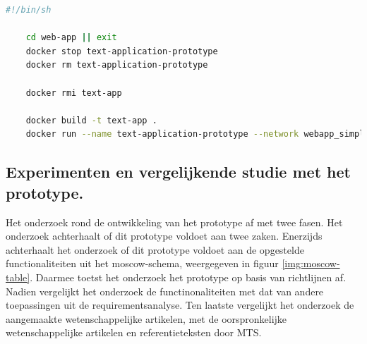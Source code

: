\begin{lstlisting}[language=Bash, caption={Script voor het opstarten van de Docker-container voor Unix-gebruikers}, label={code:bash-boot}]
	#!/bin/sh
	
	cd web-app || exit
	docker stop text-application-prototype
	docker rm text-application-prototype
	
	docker rmi text-app
	
	docker build -t text-app .
	docker run --name text-application-prototype --network webapp_simplification -d -p 5000:5000 text-app
\end{lstlisting}


\subsection{Experimenten en vergelijkende studie met het prototype.}

Het onderzoek rond de ontwikkeling van het prototype af met twee fasen. Het onderzoek achterhaalt of dit prototype voldoet aan twee zaken. Enerzijds achterhaalt het onderzoek of dit prototype voldoet aan de opgestelde functionaliteiten uit het moscow-schema, weergegeven in figuur \ref{img:moscow-table}. Daarmee toetst het onderzoek het prototype op basis van richtlijnen af. Nadien vergelijkt het onderzoek de functinonaliteiten met dat van andere toepassingen uit de requirementsanalyse. Ten laatste vergelijkt het onderzoek de aangemaakte wetenschappelijke artikelen, met de oorspronkelijke wetenschappelijke artikelen en referentieteksten door MTS.